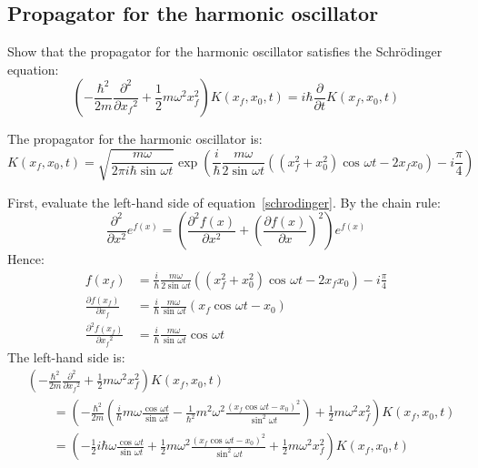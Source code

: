 \newcommand{\half}{\frac{1}{2}}
\newcommand{\ihbar}{\frac{i}{\hbar}}

\newcommand{\func}[2]{\mathcal{#1}\left[\,{#2}\,\right]}

\newcommand{\w}{\omega}
\newcommand{\sinwt}[1][]{\sin^{#1}\omega t}
\newcommand{\coswt}[1][]{\cos^{#1}\omega t}
\newcommand{\cotwt}[1][]{\cot^{#1}\omega t}
\newcommand{\cscwt}[1][]{\csc^{#1}\omega t}

\newcommand{\del}[2][]{\frac{\partial{#1}}{\partial{#2}}}
\newcommand{\delsq}[2][]{\frac{\partial^2{#1}}{\partial{#2}^2}}

\newcommand{\propagator}{K(x_f, x_0, t)}

\subsection{Propagator for the harmonic oscillator}

Show that the propagator for the harmonic oscillator satisfies the
Schr\"{o}dinger equation:
\begin{equation}
  \label{schrodinger}
  \left(-\frac{\hbar^2}{2m}\delsq{x_f} + \half m\w ^2 x_f^2\right) \propagator
  =
  i\hbar\del{t}\propagator
\end{equation}

The propagator for the harmonic oscillator is:
\begin{equation}
  \label{propagator}
  \propagator
  =
  \sqrt{\frac{m\w }{2\pi i\hbar\sinwt}}
  \exp\left(
  \ihbar\frac{m\w }{2\sinwt}\left(
  (x_f^2 + x_0^2)\coswt - 2x_f x_0
  \right) - i\frac{\pi}{4}
  \right)
\end{equation}

First, evaluate the left-hand side of equation~\ref{schrodinger}.
By the chain rule:
\begin{equation*}
  \delsq{x} e^{f(x)}
  =
  \left(\delsq[f(x)]{x} + \left(\del[f(x)]{x}\right)^2\right) e^{f(x)}
\end{equation*}
Hence:
\begin{align*}
  f(x_f)
   & =
  \ihbar\frac{m\w }{2\sinwt}\left(
  (x_f^2 + x_0^2)\coswt - 2x_f x_0
  \right) - i\frac{\pi}{4}
  \\[2ex]
  \del[f(x_f)]{x_f}
   & =
  \ihbar\frac{m\w }{\sinwt}\left(
  x_f\coswt - x_0
  \right)
  \\[2ex]
  \delsq[f(x_f)]{x_f}
   & =
  \ihbar\frac{m\w }{\sinwt}\coswt
\end{align*}
The left-hand side is:
\begin{align}
   & \left(-\frac{\hbar^2}{2m}\delsq{x_f} +
  \half m\w ^2 x_f^2\right) \propagator
  \nonumber
  \\[2ex]
   & \qquad =
  \left(
  -\frac{\hbar^2}{2m}\left(
    \ihbar m\w\frac{\coswt}{\sinwt} -
    \frac{1}{\hbar^2}m^2\w ^2 \frac{(x_f \coswt - x_0)^2}{\sinwt[2]}
    \right) +
  \half m\w ^2 x_f^2
  \right)
  \propagator
  \nonumber
  \\[2ex]
  \label{lhs}
   & \qquad =
  \left(
  -\half i\hbar\w\frac{\coswt}{\sinwt} +
  \half m\w^2\frac{(x_f \coswt - x_0)^2}{\sinwt[2]} +
  \half m\w ^2 x_f^2
  \right)
  \propagator
\end{align}

